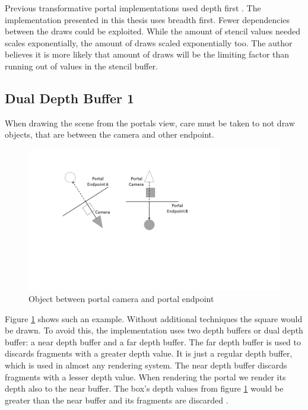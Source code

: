 Previous transformative portal implementations used depth first \cite{lowe:2005:technique,lecture:portalProblems}. The implementation presented in this thesis uses breadth first. Fewer dependencies between the draws could be exploited. While the amount of stencil values needed scales exponentially, the amount of draws scaled exponentially too. The author believes it is more likely that amount of draws will be the limiting factor than running out of values in the stencil buffer.

\subsection{Dual Depth Buffer 1}

When drawing the scene from the portals view, care must be taken to not draw objects, that are between the camera and other endpoint.
\begin{figure}[h]
	\includegraphics[width=\linewidth]{images/bananajuce.png}
	\caption{Object between portal camera and portal endpoint}
	\label{fig:bananajuce}
\end{figure}

Figure \ref{fig:bananajuce} shows such an example. Without additional techniques the square would be drawn. To avoid this, the implementation uses two depth buffers or dual depth buffer: a near depth buffer and a far depth buffer. The far depth buffer is used to discards fragments with a greater depth value. It is just a regular depth buffer, which is used in almost any rendering system. The near depth buffer discards fragments with a lesser depth value. When rendering the portal we render its depth also to the near buffer. The box's depth values from figure \ref{fig:bananajuce} would be greater than the near buffer and its fragments are discarded \cite{lowe:2005:technique}.

